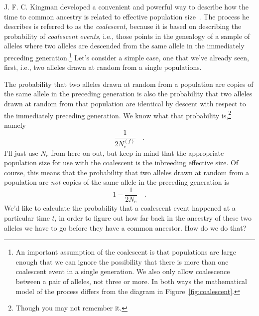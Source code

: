 J. F. C. Kingman developed a convenient and powerful way to describe
how the time to common ancestry is related to effective population
size~\cite{Kingman-1982-genealogy,Kingman-1982-coalescent}. The
process he describes is referred to as the {\it coalescent}, because
it is based on describing the probability of {\it coalescent
  events}, i.e., those points in the
genealogy of a sample of alleles where two alleles are descended from
the same allele in the immediately preceding generation.\footnote{An
  important assumption of the coalescent is that populations are large
  enough that we can ignore the possibility that there is more than
  one coalescent event in a single generation. We also only allow
  coalescence between a pair of alleles, not three or more. In both
  ways the mathematical model of the process differs from the diagram
  in Figure~\ref{fig:coalescent}.}  Let's consider a simple case, one
that we've already seen, first, i.e., two alleles drawn at random from
a single populations.

The probability that two alleles drawn at random from a population are
copies of the same allele in the preceding generation is also the
probability that two alleles drawn at random from that population are
identical by descent with respect to the immediately preceding
generation. We know what that probability is,\footnote{Though you may
not remember it.} namely
\[
\frac{1}{2N_e^{(f)}} \quad .
\]
I'll just use $N_e$ from here on out, but keep in mind that the
appropriate population size for use with the coalescent is the
inbreeding effective size. Of course, this means that the probability
that two alleles drawn at random from a population are {\it not\/}
copies of the same allele in the preceding generation is
\[
1 - \frac{1}{2N_e} \quad .
\]
We'd like to calculate the probability that a coalescent event
happened at a particular time $t$, in order to figure out how far back
in the ancestry of these two alleles we have to go before they have a
common ancestor. How do we do that?

